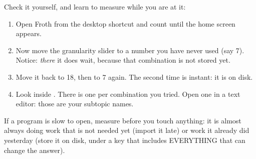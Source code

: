 \documentclass[11pt,a4paper]{article}
\begin{document}
\begin{practica}
Check it yourself, and learn to measure while you are at it:

\begin{enumerate}
  \item Open Froth from the desktop shortcut and count until the home screen appears.
  \item Now move the granularity slider to a number you have never used (say 7). Notice:
        \emph{there} it does wait, because that combination is not stored yet.
  \item Move it back to 18, then to 7 again. The second time is instant: it is on disk.
  \item Look inside . There is one
         per combination you tried. Open one in a text editor:
        those are your subtopic names.
\end{enumerate}
\end{practica}

\begin{resumen}
If a program is slow to open, measure before you touch anything: it is almost always
doing work that is not needed yet (import it late) or work it already did yesterday
(store it on disk, under a key that includes EVERYTHING that can change the answer).
\end{resumen}
\end{document}

